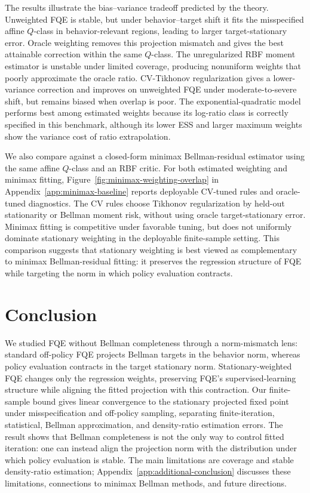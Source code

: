 \documentclass{article}
\theoremstyle{plain}
\theoremstyle{definition}
\theoremstyle{remark}
\begin{document}
The results illustrate the bias--variance tradeoff predicted by the theory.
Unweighted FQE is stable, but under behavior--target shift it fits the
misspecified affine \(Q\)-class in behavior-relevant regions, leading to larger
target-stationary error. Oracle weighting removes this projection mismatch and
gives the best attainable correction within the same \(Q\)-class. The
unregularized RBF moment estimator is unstable under limited coverage, producing
nonuniform weights that poorly approximate the oracle ratio. CV-Tikhonov
regularization gives a lower-variance correction and improves on unweighted FQE
under moderate-to-severe shift, but remains biased when overlap is poor. The
exponential-quadratic model performs best among estimated weights because its
log-ratio class is correctly specified in this benchmark, although its lower ESS
and larger maximum weights show the variance cost of ratio extrapolation.

We also compare against a closed-form minimax Bellman-residual estimator using
the same affine \(Q\)-class and an RBF critic. For both estimated weighting and
minimax fitting, Figure~\ref{fig:minimax-weighting-overlap} in
Appendix~\ref{app:minimax-baseline} reports deployable CV-tuned rules and
oracle-tuned diagnostics. The CV rules choose Tikhonov regularization by
held-out stationarity or Bellman moment risk, without using oracle
target-stationary error. Minimax fitting is competitive under favorable tuning,
but does not uniformly dominate stationary weighting in the deployable
finite-sample setting. This comparison suggests that stationary weighting is
best viewed as complementary to minimax Bellman-residual fitting: it preserves
the regression structure of FQE while targeting the norm in which policy
evaluation contracts.

\section{Conclusion}

We studied FQE without Bellman completeness through a norm-mismatch lens:
standard off-policy FQE projects Bellman targets in the behavior norm, whereas
policy evaluation contracts in the target stationary norm. Stationary-weighted
FQE changes only the regression weights, preserving FQE's supervised-learning
structure while aligning the fitted projection with this contraction. Our
finite-sample bound gives linear convergence to the stationary projected fixed
point under misspecification and off-policy sampling, separating
finite-iteration, statistical, Bellman approximation, and density-ratio
estimation errors. The result shows that Bellman completeness is not the only
way to control fitted iteration: one can instead align the projection norm with
the distribution under which policy evaluation is stable. The main limitations
are coverage and stable density-ratio estimation; Appendix~\ref{app:additional-conclusion}
discusses these limitations, connections to minimax Bellman methods, and future
directions.
\end{document}
